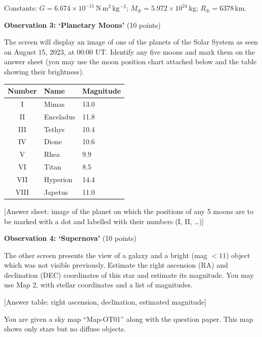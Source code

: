 Constants: $G = 6.674 \times 10^{-11}\,\mathrm{N\,m^2\,kg^{-2}}$;
$M_\oplus = 5.972 \times 10^{24}$\,kg; $R_\oplus = 6378$\,km.

\medskip
\textbf{Observation 3: `Planetary Moons'} (10 points)

The screen will display an image of one of the planets of the Solar System
as seen on August 15, 2023, at 00:00 UT. Identify any five moons and mark
them on the answer sheet (you may use the moon position chart attached below
and the table showing their brightness).


\begin{center}
\begin{tabular}{cll}
Number & Name & Magnitude \\
\hline
I & Mimas & 13.0 \\
II & Enceladus & 11.8 \\
III & Tethys & 10.4 \\
IV & Dione & 10.6 \\
V & Rhea & 9.9 \\
VI & Titan & 8.5 \\
VII & Hyperion & 14.4 \\
VIII & Japetus & 11.0 \\
\end{tabular}
\end{center}

[Answer sheet: image of the planet on which the positions of any 5 moons are
to be marked with a dot and labelled with their numbers (I, II, \ldots)]

\medskip
\textbf{Observation 4: `Supernova'} (10 points)

The other screen presents the view of a galaxy and a bright (mag $< 11$)
object which was not visible previously. Estimate the right ascension (RA)
and declination (DEC) coordinates of this star and estimate its magnitude.
You may use Map 2, with stellar coordinates and a list of magnitudes.

[Answer table: right ascension, declination, estimated magnitude]


You are given a sky map ``Map-OT01'' along with the question paper. This map
shows only stars but no diffuse objects.

